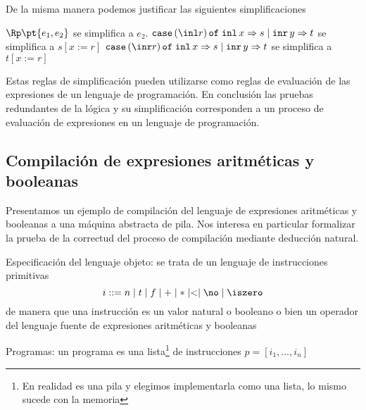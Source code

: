 \documentclass[11pt,letterpaper]{article}
\begin{document}
De la misma manera podemos justificar las siguientes simplificaciones

\bc
$\Rp\pt{e_1,e_2}$ se simplifica a $e_2$.
\ec
\bc
${\tt case}\,(\inl r)\,{\tt of }\;{\tt inl}\,x\Rightarrow s\mid{\tt
  inr}\,y\Rightarrow t$ se simplifica a $s[x:=r]$
\ec
\bc
${\tt case}\,(\inr r)\,{\tt of }\;{\tt inl}\,x\Rightarrow s\mid{\tt
  inr}\,y\Rightarrow t$ se simplifica a $t[x:=r]$
\ec

Estas reglas de simplificación pueden utilizarse como reglas de evaluación de
las expresiones de un lenguaje de programación. En conclusión las pruebas
redundantes de la lógica y su simplificación corresponden a un proceso de
evaluación de expresiones en un lenguaje de programación. 







\subsection{Compilación de expresiones aritméticas y booleanas}

Presentamos un ejemplo de compilación del lenguaje de expresiones aritméticas y 
booleanas a una máquina abstracta de pila. Nos interesa en particular 
formalizar la prueba de la correctud del proceso de compilación mediante 
deducción natural.

\bi
\item Especificación del lenguaje objeto: se trata de un lenguaje de 
instrucciones primitivas
$$ i ::= n\mid t\mid f\mid+\mid*\mid<\mid\no\mid\iszero $$
de manera que una instrucción es un valor natural o booleano o bien un operador 
del lenguaje fuente de expresiones aritméticas y booleanas

\item Programas: un programa es una lista\footnote{En realidad es una pila y 
elegimos implementarla como una lista, lo mismo sucede con la memoria} de 
instrucciones
$p=[i_1,\ldots,i_n]$
\end{document}
